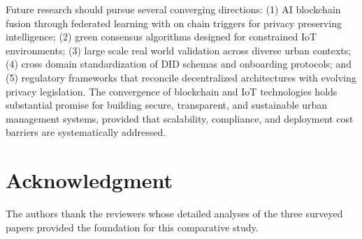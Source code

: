 \documentclass[conference]{IEEEtran}
\begin{document}
Future research should pursue several converging directions: (1) AI blockchain fusion through federated learning with on chain triggers for privacy preserving intelligence; (2) green consensus algorithms designed for constrained IoT environments; (3) large scale real world validation across diverse urban contexts; (4) cross domain standardization of DID schemas and onboarding protocols; and (5) regulatory frameworks that reconcile decentralized architectures with evolving privacy legislation. The convergence of blockchain and IoT technologies holds substantial promise for building secure, transparent, and sustainable urban management systems, provided that scalability, compliance, and deployment cost barriers are systematically addressed.

\section*{Acknowledgment}

The authors thank the reviewers whose detailed analyses of the three surveyed papers provided the foundation for this comparative study.
\end{document}
